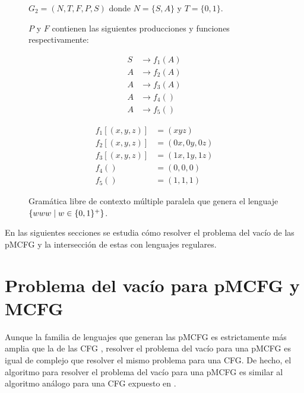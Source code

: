 \begin{figure}[h]
    \centering
    $G_2 = (N, T, F, P, S)$ donde $N = \{S, A\}$ y $T = \{0, 1\}$.

    $P$ y $F$ contienen las siguientes producciones y funciones respectivamente:

    \begin{minipage}{0.45\textwidth}
        \begin{align*}
            S & \to f_1(A) \\
            A & \to f_2(A) \\
            A & \to f_3(A) \\
            A & \to f_4()  \\
            A & \to f_5()
        \end{align*}
    \end{minipage}
    \hfill
    \begin{minipage}{0.45\textwidth}
        \begin{align*}
            f_1[(x,y,z)] & = (xyz)      \\
            f_2[(x,y,z)] & = (0x,0y,0z) \\
            f_3[(x,y,z)] & = (1x,1y,1z) \\
            f_4()        & = (0,0,0)    \\
            f_5()        & = (1,1,1)
        \end{align*}
    \end{minipage}

    \caption{Gramática libre de contexto múltiple paralela que genera el lenguaje $\{www \;|\; w \in \{0, 1\}^+\}$.}
    \label{fig:pmcfg-example-2}
\end{figure}

En las siguientes secciones se estudia cómo resolver el problema del vacío de las pMCFG y la intersección de estas con lenguajes regulares.

\section{Problema del vacío para pMCFG y MCFG}
\label{sec:emptiness}

Aunque la familia de lenguajes que generan las pMCFG es estrictamente más amplia que la de las CFG \cite{Seki1991OnMC}, resolver el problema del vacío para una pMCFG es igual de complejo que resolver el mismo problema para una CFG. De hecho, el algoritmo para resolver el problema del vacío para una pMCFG es similar al algoritmo análogo para una CFG expuesto en \cite{automataTheory}.


